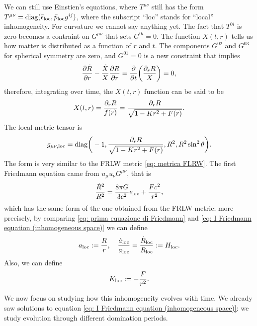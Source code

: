 We can still use Einstien's equations, where $T^{\mu\nu}$ still has the form $T^{\mu\nu} = \mathrm{diag}{(\bar{\epsilon}_{\mathrm{loc}},\bar{p}_{\mathrm{loc}}g^{ij})}$, where the subscript ``loc'' stands for ``local'' inhomogeneity. For curvature we cannot say anything yet. The fact that $T^{0i}$ is zero becomes a contraint on $G^{\mu\nu}$ that sets $G^{0i} = 0$. The function $X(t,r)$ tells us how matter is distributed as a function of $r$ and $t$. The components $G^{02}$ and $G^{03}$ for spherical symmetry are zero, and $G^{01} = 0$ is a new constraint that implies 
\begin{equation}
    \frac{\partial\dot{R}}{\partial r} - \frac{\dot{X}}{X}\frac{\partial R}{\partial r} = \frac{\partial}{\partial t}\bigg(\frac{\partial_r R}{X}\bigg) = 0,
\end{equation}
therefore, integrating over time, the $X(t,r)$ function can be said to be
\begin{equation}
    X(t,r) = \frac{\partial_r R}{f(r)} = \frac{\partial_r R}{\sqrt{1 - Kr^2 + F(r)}}.
\end{equation}
The local metric tensor is 
\begin{equation}
    g_{\mu\nu,\mathrm{loc}} = \mathrm{diag}{\bigg(-1,\frac{\partial_r R}{\sqrt{1 - Kr^2 + F(r)}},R^2,R^2\sin^2{\theta}\bigg)}.
\end{equation}
The form is very similar to the FRLW metric \eqref{eq: metrica FLRW}. The first Friedmann equation came from $u_\mu u_\nu G^{\mu\nu}$, that is
\begin{equation}
\label{eq: I Friedmann equation (inhomogeneous space)}
    \frac{\dot{R}^2}{R^2} = \frac{8\pi G}{3c^2}\epsilon_{\mathrm{loc}} + \frac{Fc^2}{r^2},
\end{equation}
which has the same form of the one obtained from the FRLW metric; more precisely, by comparing \eqref{eq: prima equazione di Friedmann} and \eqref{eq: I Friedmann equation (inhomogeneous space)} we can define 
\begin{equation}
    a_{\mathrm{loc}} := \frac{R}{r},\quad \frac{\dot{a}_{\mathrm{loc}}}{a_{\mathrm{loc}}} = \frac{\dot{R}_{\mathrm{loc}}}{R_{\mathrm{loc}}} := H_{\mathrm{loc}}.
\end{equation}
Also, we can define 
\begin{equation}
    K_{\mathrm{loc}} := -\frac{F}{r^2}. 
\end{equation}

We now focus on studying how this inhomogeneity evolves with time. We already saw solutions to equation \eqref{eq: I Friedmann equation (inhomogeneous space)}: we study evolution through different domination periods. 
